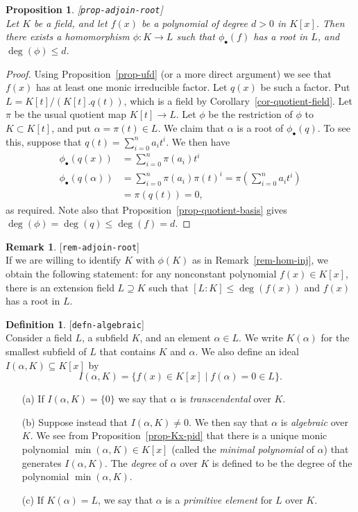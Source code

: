 \documentclass{amsart}
\newcommand{\lbl}[1]{\label{#1}\textup{[\texttt{#1}]}\ \\}
\newcommand{\lbl}{\label}
\newcommand{\al}        {\alpha}
\newcommand{\st}        {\;|\;}
\newcommand{\sse}       {\subseteq}
\renewcommand{\:}{\colon}
\newtheorem{proposition}[theorem]{Proposition}
\theoremstyle{definition}
\newtheorem{remark}[theorem]{Remark}
\newtheorem{definition}[theorem]{Definition}
\begin{document}
\begin{proposition}\lbl{prop-adjoin-root}
 Let $K$ be a field, and let $f(x)$ be a polynomial of degree $d>0$ in
 $K[x]$.  Then there exists a homomorphism $\phi\:K\to L$ such that
 $\phi_\bullet(f)$ has a root in $L$, and $\deg(\phi)\leq d$.
\end{proposition}
\begin{proof}
 Using Proposition~\ref{prop-ufd} (or a more direct argument) we see
 that $f(x)$ has at least one monic irreducible factor.  Let $q(x)$ be
 such a factor.  Put $L=K[t]/(K[t].q(t))$, which is a field by
 Corollary~\ref{cor-quotient-field}.  Let $\pi$ be the usual quotient
 map $K[t]\to L$.  Let $\phi$ be the restriction of $\phi$ to
 $K\subset K[t]$, and put $\al=\pi(t)\in L$.  We claim that $\al$ is a
 root of $\phi_\bullet(q)$.  To see this, suppose that
 $q(t)=\sum_{i=0}^na_it^i$.  We then have
 \begin{align*}
  \phi_\bullet(q(x)) &= \sum_{i=0}^n \pi(a_i)t^i \\
  \phi_\bullet(q(\al)) &= \sum_{i=0}^n \pi(a_i)\pi(t)^i 
    = \pi\left(\sum_{i=0}^na_it^i\right) \\
   &= \pi(q(t)) = 0,
 \end{align*}
 as required.  Note also that Proposition~\ref{prop-quotient-basis}
 gives $\deg(\phi)=\deg(q)\leq\deg(f)=d$.
\end{proof}

\begin{remark}\lbl{rem-adjoin-root}
 If we are willing to identify $K$ with $\phi(K)$ as in
 Remark~\ref{rem-hom-inj}, we obtain the following statement: for any
 nonconstant polynomial $f(x)\in K[x]$, there is an extension field
 $L\supseteq K$ such that $[L:K]\leq\deg(f(x))$ and $f(x)$ has a root
 in $L$.
\end{remark}

\begin{definition}\lbl{defn-algebraic}
 Consider a field $L$, a subfield $K$, and an element $\al\in L$.  We
 write $K(\al)$ for the smallest subfield of $L$ that contains $K$ and
 $\al$.  We also define an ideal $I(\al,K)\sse K[x]$ by 
 \[ I(\al,K) = \{f(x)\in K[x]\st f(\al)=0\in L\}. \]
 \begin{itemize}
  \item[(a)] If $I(\al,K)=\{0\}$ we say that $\al$ is \emph{transcendental}
   over $K$.
  \item[(b)] Suppose instead that $I(\al,K)\neq 0$.  We then say that
   $\al$ is \emph{algebraic} over $K$.  We see from
   Proposition~\ref{prop-Kx-pid} that there is a unique monic
   polynomial $\min(\al,K)\in K[x]$ (called the \emph{minimal
    polynomial} of $\al$) that generates $I(\al,K)$.  The \emph{degree}
   of $\al$ over $K$ is defined to be the degree of the polynomial
   $\min(\al,K)$. 
  \item[(c)] If $K(\al)=L$, we say that $\al$ is a \emph{primitive
    element} for $L$ over $K$.
 \end{itemize}
\end{definition}
\end{document}
